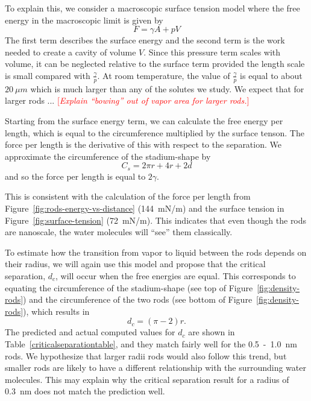 \documentclass[letterpaper,twocolumn,amsmath,amssymb,prb]{revtex4-1}
\newcommand{\needsworknow}[1]{\textcolor{red}{[\emph{#1}]}}
\begin{document}
To explain this, we consider a macroscopic surface
tension model where the free energy in the macroscopic limit is given by 
\begin{equation}
F = \gamma A + pV
\end{equation}
The first term describes the surface energy and the second term
is the work needed to create a cavity of volume $V$. Since this pressure term
scales with volume, it can be neglected relative to the surface term provided
the length scale is small compared with $\frac{\gamma} p$. At room temperature,
the value of $\frac{\gamma} p$ is equal to about $20~\mu m$ which is
much larger than any of the solutes we study. We expect that for larger 
rods ... \needsworknow{Explain ``bowing'' out of vapor area for larger rods.}

Starting from the surface energy term, we can calculate the 
free energy per 
length, which is equal to the circumference multiplied by the surface tenson. 
The force
per length is the derivative of this with respect to the separation. 
We approximate the circumference of the stadium-shape by
\begin{equation}
C_{s} = 2\pi r +4r+2d
\end{equation}
and so the force per length is equal to $2\gamma$.

This is consistent with the calculation of the force per length from 
Figure~\ref{fig:rods-energy-vs-distance} (144~mN/m) and the surface tension 
in Figure~\ref{fig:surface-tension} (72~mN/m). This indicates that
even though the rods are nanoscale, the water molecules will ``see'' them classically.

To estimate how the transition from vapor to liquid between the rods depends on their 
radius, we will again use this model and propose that 
the critical separation, $d_c$, will occur when the free energies are equal. This 
corresponds to equating the circumference of the stadium-shape (see 
top of Figure~\ref{fig:density-rods}) and the circumference of the two rods (see bottom
of Figure~\ref{fig:density-rods}), which results in
\begin{equation}
d_c = (\pi-2)r.\label{criticalseparation}
\end{equation}
The predicted and actual computed values for $d_c$ are shown in 
Table~\ref{criticalseparationtable}, and they match fairly well for the 
0.5~-~1.0~nm rods. We hypothesize that larger radii rods
would also follow this trend, but smaller rods are likely to have a different
relationship with the surrounding water molecules. This may explain why the critical
separation result for a radius of 0.3~nm does not match the prediction well.
\end{document}
